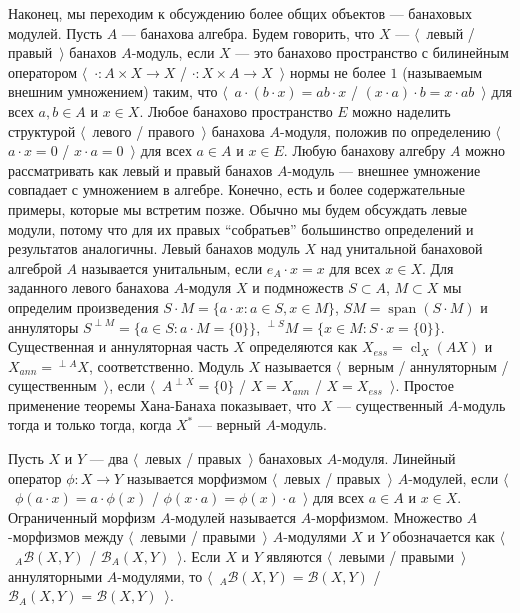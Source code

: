 Наконец, мы переходим к обсуждению более общих объектов --- банаховых модулей. Пусть $A$ --- банахова алгебра. Будем говорить, что $X$ --- $\langle$~левый / правый~$\rangle$ банахов $A$-модуль, если $X$ --- это банахово пространство с билинейным оператором $\langle$~$\cdot:A\times X\to X$ / $\cdot: X\times A\to X$~$\rangle$ нормы не более $1$ (называемым внешним умножением) таким, что $\langle$~$a\cdot(b\cdot x)=ab\cdot x$ / $(x\cdot a)\cdot b=x\cdot ab$~$\rangle$ для всех $a,b\in A$ и $x\in X$. Любое банахово пространство $E$ можно наделить структурой $\langle$~левого / правого~$\rangle$ банахова $A$-модуля, положив по определению $\langle$~$a\cdot x=0$ / $x\cdot a=0$~$\rangle$ для всех $a\in A$ и $x\in E$. Любую банахову алгебру $A$ можно рассматривать как левый и правый банахов $A$-модуль --- внешнее умножение совпадает с умножением в алгебре. Конечно, есть и более содержательные примеры, которые мы встретим позже. Обычно мы будем обсуждать левые модули, потому что для их правых ``собратьев'' большинство определений и результатов аналогичны. Левый банахов модуль $X$ над унитальной банаховой алгеброй $A$ называется унитальным, если $e_A\cdot x=x$ для всех $x\in X$. Для заданного левого банахова $A$-модуля $X$ и подмножеств $S\subset A$, $M\subset X$ мы определим произведения $S\cdot M=\{a\cdot x:a\in S, x\in M\}$, $SM=\operatorname{span} (S\cdot M)$ и аннуляторы $S^{\perp M}=\{a\in S:a\cdot M=\{0\}\}$, ${}^{\perp S}M=\{x\in M: S\cdot x=\{0\}\}$. Существенная и аннуляторная часть $X$ определяются как $X_{ess}=\operatorname{cl}_X(A X)$ и $X_{ann}={}^{\perp A}X$, соответственно. Модуль $X$ называется $\langle$~верным / аннуляторным / существенным~$\rangle$, если $\langle$~$A^{\perp X}=\{0\}$ / $X=X_{ann}$ / $X=X_{ess}$~$\rangle$. Простое применение теоремы Хана-Банаха показывает, что $X$ --- существенный $A$-модуль тогда и только тогда, когда $X^*$ --- верный $A$-модуль.

Пусть $X$ и $Y$ --- два $\langle$~левых / правых~$\rangle$ банаховых $A$-модуля. Линейный оператор $\phi:X\to Y$ называется морфизмом $\langle$~левых / правых~$\rangle$ $A$-модулей, если $\langle$~$\phi(a\cdot x)=a\cdot \phi(x)$ / $\phi(x\cdot a)=\phi(x)\cdot a$~$\rangle$ для всех $a\in A$ и $x\in X$. Ограниченный морфизм $A$-модулей называется $A$-морфизмом. Множество $A$-морфизмов между $\langle$~левыми / правыми~$\rangle$ $A$-модулями $X$ и $Y$ обозначается как $\langle$~${}_A\mathcal{B}(X,Y)$ / $\mathcal{B}_A(X,Y)$~$\rangle$. Если $X$ и $Y$ являются $\langle$~левыми / правыми~$\rangle$ аннуляторными $A$-модулями, то $\langle$~${}_A\mathcal{B}(X,Y)=\mathcal{B}(X,Y)$ / $\mathcal{B}_A(X,Y)=\mathcal{B}(X,Y)$~$\rangle$.

